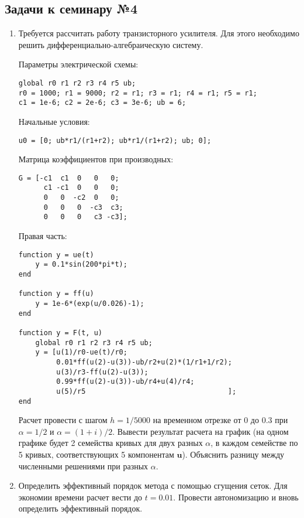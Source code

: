 \subsection{Задачи к семинару №4}
\begin{enumerate}
\item Требуется рассчитать работу транзисторного усилителя. Для этого необходимо решить дифференциально-алгебраическую систему.

Параметры электрической схемы:
\begin{matlablisting}
	\begin{lstlisting}
global r0 r1 r2 r3 r4 r5 ub;
r0 = 1000; r1 = 9000; r2 = r1; r3 = r1; r4 = r1; r5 = r1;
c1 = 1e-6; c2 = 2e-6; c3 = 3e-6; ub = 6;
	\end{lstlisting}
\end{matlablisting}
Начальные условия:
\begin{matlablisting}
	\begin{lstlisting}
u0 = [0; ub*r1/(r1+r2); ub*r1/(r1+r2); ub; 0];
	\end{lstlisting}
\end{matlablisting}
Матрица коэффициентов при производных:
\begin{matlablisting}
	\begin{lstlisting}
G = [-c1  c1  0   0   0;
      c1 -c1  0   0   0;
      0   0  -c2  0   0;
      0   0   0  -c3  c3;
      0   0   0   c3 -c3];
	\end{lstlisting}
\end{matlablisting}
Правая часть:
\begin{matlablisting}
	\begin{lstlisting}
function y = ue(t)
    y = 0.1*sin(200*pi*t);
end

function y = ff(u)
    y = 1e-6*(exp(u/0.026)-1);
end

function y = F(t, u)
    global r0 r1 r2 r3 r4 r5 ub;
    y = [u(1)/r0-ue(t)/r0; 
         0.01*ff(u(2)-u(3))-ub/r2+u(2)*(1/r1+1/r2);
         u(3)/r3-ff(u(2)-u(3)); 
         0.99*ff(u(2)-u(3))-ub/r4+u(4)/r4; 
         u(5)/r5                                  ];
end
	\end{lstlisting}
\end{matlablisting}
Расчет провести с шагом $h = 1/5000$ на временном отрезке от 0 до 0.3 при $\alpha = 1/2$ и $\alpha = (1+i)/2$. Вывести результат расчета на график (на одном графике будет 2 семейства кривых для двух разных $\alpha$, в каждом семействе по 5 кривых, соответствующих 5 компонентам $\mathbf{u}$). Объяснить разницу между численными решениями при разных $\alpha$.
\item Определить  эффективный порядок метода с помощью сгущения сеток. Для экономии времени расчет вести до $t = 0.01$. Провести автономизацию и вновь определить эффективный порядок.
\end{enumerate}